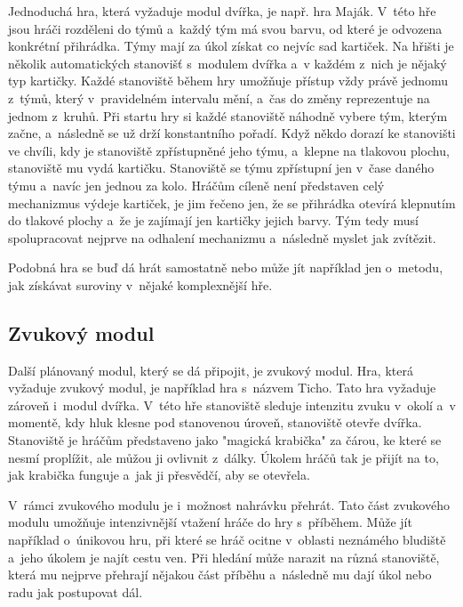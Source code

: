 Jednoduchá hra, která vyžaduje modul dvířka, je např. hra Maják. %
V~této hře jsou hráči rozděleni do týmů a~každý tým má svou barvu, od které je odvozena konkrétní přihrádka. 
Týmy mají za úkol získat co nejvíc sad kartiček.
Na hřišti je několik automatických stanovišť s~modulem dvířka a~v každém z~nich je nějaký typ kartičky.
Každé stanoviště během hry umožňuje přístup vždy právě jednomu z~týmů, který v~pravidelném intervalu mění, a~čas do změny reprezentuje na jednom z~kruhů.
Při startu hry si každé stanoviště náhodně vybere tým, kterým začne, a~následně se už drží konstantního pořadí.
Když někdo dorazí ke stanovišti ve chvíli, kdy je stanoviště zpřístupněné jeho týmu, a~klepne na tlakovou plochu, stanoviště mu vydá kartičku.
Stanoviště se týmu zpřístupní jen v~čase daného týmu a~navíc jen jednou za kolo.
Hráčům cíleně není představen celý mechanizmus výdeje kartiček, je jim řečeno jen, že se přihrádka otevírá klepnutím do tlakové plochy a~že je zajímají jen kartičky jejich barvy. 
Tým tedy musí spolupracovat nejprve na odhalení mechanizmu a~následně myslet jak zvítězit.

Podobná hra se buď dá hrát samostatně nebo může jít například jen o~metodu, jak získávat suroviny v~nějaké komplexnější hře.

\subsection{Zvukový modul}
Další plánovaný modul, který se dá připojit, je zvukový modul.
Hra, která vyžaduje zvukový modul, je například hra s~názvem Ticho.
Tato hra vyžaduje zároveň i~modul dvířka.
V~této hře stanoviště sleduje intenzitu zvuku v~okolí a~v momentě, kdy hluk klesne pod stanovenou úroveň, stanoviště otevře dvířka. 
Stanoviště je hráčům představeno jako "magická krabička"\- za čárou, ke které se nesmí proplížit, ale můžou ji ovlivnit z~dálky.
Úkolem hráčů tak je přijít na to, jak krabička funguje a~jak ji přesvědčí, aby se otevřela.

V~rámci zvukového modulu je i~možnost nahrávku přehrát.
Tato část zvukového modulu umožňuje intenzivnější vtažení hráče do hry s~příběhem.
Může jít například o~únikovou hru, při které se hráč ocitne v~oblasti neznámého bludiště a~jeho úkolem je najít cestu ven.
Při hledání může narazit na různá stanoviště, která mu nejprve přehrají nějakou část příběhu a~následně mu dají úkol nebo radu jak postupovat dál.

